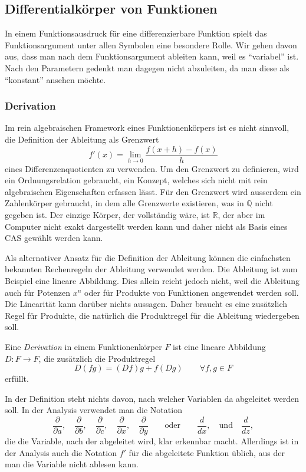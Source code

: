 %
%
\subsection{Differentialkörper von Funktionen}
In einem Funktionsausdruck für eine differenzierbare Funktion spielt
das Funktionsargument unter allen Symbolen eine besondere Rolle.
Wir gehen davon aus, dass man nach dem Funktionsargument ableiten
kann, weil es ``variabel'' ist.
Nach den Parametern gedenkt man dagegen nicht abzuleiten, da man
diese als ``konstant'' ansehen möchte.

%
%
\subsubsection{Derivation}
Im rein algebraischen Framework eines Funktionenkörpers ist es nicht
sinnvoll, die Definition der Ableitung als Grenzwert
\[
f'(x)
=
\lim_{h\to 0}
\frac{f(x+h)-f(x)}{h}
\]
eines Differenzenquotienten zu verwenden.
Um den Grenzwert zu definieren, wird ein Ordnungsrelation gebraucht,
ein Konzept, welches sich nicht mit rein algebraischen Eigenschaften
erfassen lässt.
Für den Grenzwert wird ausserdem ein Zahlenkörper gebraucht, in dem
alle Grenzwerte existieren, was in $\mathbb{Q}$ nicht gegeben ist.
Der einzige Körper, der vollständig wäre, ist $\mathbb{R}$, der aber
im Computer nicht exakt dargestellt werden kann und daher nicht als
Basis eines CAS gewählt werden kann.

Als alternativer Ansatz für die Definition der Ableitung können die
einfachsten bekannten Rechenregeln der Ableitung verwendet werden.
Die Ableitung ist zum Beispiel eine lineare Abbildung.
Dies allein reicht jedoch nicht, weil die Ableitung auch für 
Potenzen $x^n$ oder für Produkte von Funktionen angewendet werden
soll.
Die Linearität kann darüber nichts aussagen.
Daher braucht es eine zusätzlich Regel für Produkte, die natürlich
die Produktregel für die Ableitung wiedergeben soll.

\begin{definition}[Derivation]
Eine \emph{Derivation} in einem Funktionenkörper $F$ ist eine 
lineare Abbildung $D\colon F\to F$, die zusätzlich die Produktregel
\[
D(fg) = (Df)g + f(Dg)\qquad\forall f,g\in F
\]
erfüllt.
%
\end{definition}

In der Definition steht nichts davon, nach welcher Variablen da
abgeleitet werden soll.
In der Analysis verwendet man die Notation
\[
\frac{\partial}{\partial a},\quad
\frac{\partial}{\partial b},\quad
\frac{\partial}{\partial c},\quad
\frac{\partial}{\partial x},\quad
\frac{\partial}{\partial y}\qquad\text{oder}\qquad
\frac{d}{dx},\quad\text{und}\quad
\frac{d}{dz},
\]
die die Variable, nach der abgeleitet wird, klar erkennbar macht.
Allerdings ist in der Analysis auch die Notation $f'$ für die
abgeleitete Funktion üblich, aus der man die Variable nicht
ablesen kann.

